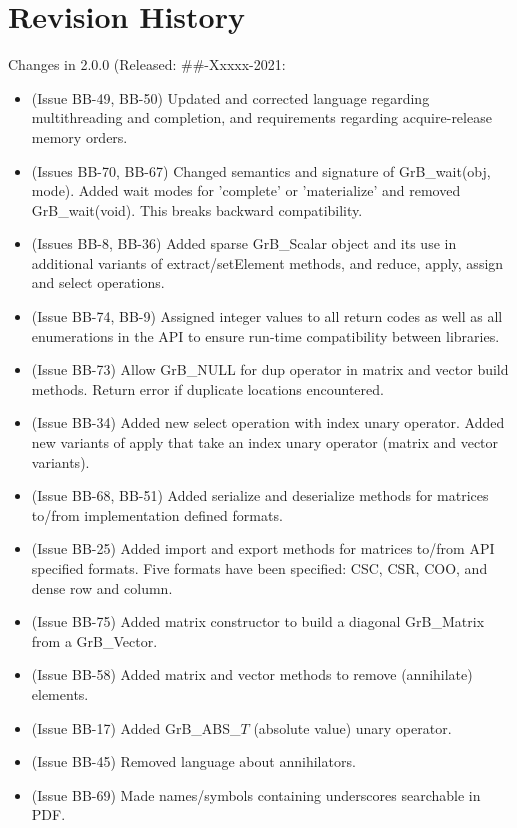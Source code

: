 \chapter{Revision History}
\label{Chp:RevHistory}

Changes in 2.0.0 (Released: \#\#-Xxxxx-2021:
\begin{itemize}
\item (Issue BB-49, BB-50) Updated and corrected language regarding multithreading and completion, and requirements regarding acquire-release memory orders.
\item (Issues BB-70, BB-67) Changed semantics and signature of {\sf GrB\_wait(obj, mode)}. Added wait modes for 'complete' or 'materialize' and removed {\sf GrB\_wait(void)}. {\color{red} This breaks backward compatibility.}  
\item (Issues BB-8, BB-36) Added sparse {\sf GrB\_Scalar} object and its use in additional variants of extract/setElement methods, and reduce, apply, assign and select operations.
\item (Issue BB-74, BB-9) Assigned integer values to all return codes as well as all enumerations in the API to ensure run-time compatibility between libraries.
\item (Issue BB-73) Allow {\sf GrB\_NULL} for dup operator in matrix and vector {\sf build} methods.  Return error if duplicate locations encountered.
\item (Issue BB-34) Added new select operation with index unary operator. Added new variants of apply that take an index unary operator (matrix and vector variants).
\item (Issue BB-68, BB-51) Added serialize and deserialize methods for matrices to/from implementation defined formats.
\item (Issue BB-25) Added import and export methods for matrices to/from API specified formats.  Five formats have been specified: CSC, CSR, COO, and dense row and column.
\item (Issue BB-75) Added matrix constructor to build a diagonal {\sf GrB\_Matrix} from a {\sf GrB\_Vector}.
\item (Issue BB-58) Added matrix and vector methods to remove (annihilate) elements.
\item (Issue BB-17) Added {\sf GrB\_ABS\_$T$} (absolute value) unary operator.
\item (Issue BB-45) Removed language about annihilators.
\item (Issue BB-69) Made names/symbols containing underscores searchable in PDF.

\end{itemize}
